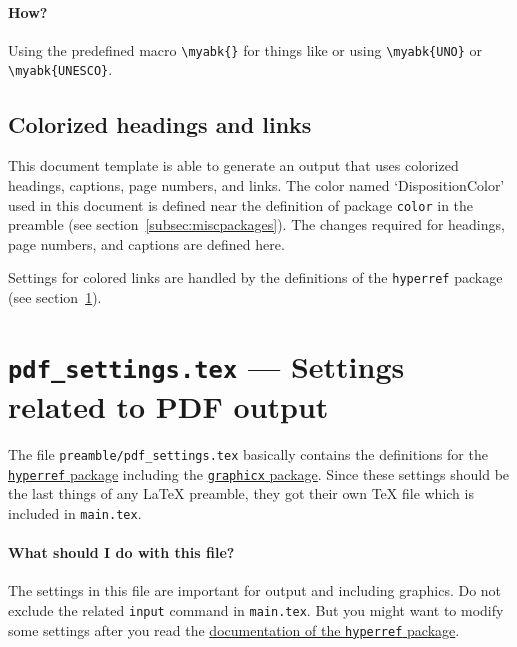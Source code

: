 \paragraph{How?} Using the predefined macro \verb#\myabk{}# for things like
 or  using \verb#\myabk{UNO}# or \verb#\myabk{UNESCO}#.


\subsection{Colorized headings and links}

This document template is able to generate an output that uses colorized
headings, captions, page numbers, and links. The color named `DispositionColor'
used in this document is defined near the definition of package \texttt{color}
in the preamble (see section~\ref{subsec:miscpackages}). The changes required
for headings, page numbers, and captions are defined here.

Settings for colored links are handled by the definitions of the
\texttt{hyperref} package (see section~\ref{sec:pdf}).

\section{\texttt{pdf\_settings.tex} --- Settings related to PDF output}
\label{sec:pdf}

The file \verb#preamble/pdf_settings.tex# basically contains the definitions for
the \href{http://tug.org/applications/hyperref/}{\texttt{hyperref} package}
including the
\href{http://www.ctan.org/tex-archive/macros/latex/required/graphics/}{\texttt{graphicx}
package}. Since these settings should be the last things of any \LaTeX{}
preamble, they got their own \TeX{} file which is included in \texttt{main.tex}.

\paragraph{What should I do with this file?} The settings in this file are
important for  output and including graphics. Do not exclude the
related \texttt{input} command in \texttt{main.tex}. But you might want to
modify some settings after you read the
\href{http://tug.org/applications/hyperref/}{documentation of the \texttt{hyperref} package}.

